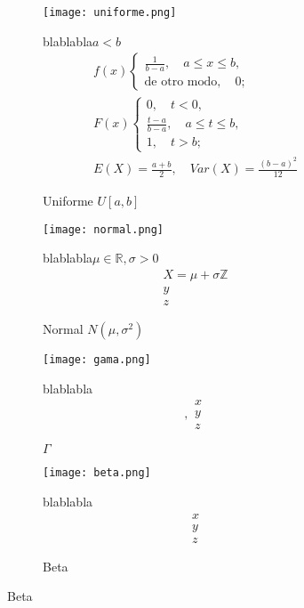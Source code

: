 \begin{figure}[H]
	\begin{subfigure}[t]{.5\textwidth}
		\texttt{[image: uniforme.png]}\caption{Uniforme $U[a,b]$}
		blablabla$a<b$
		\begin{equation}
		\begin{matrix}
		f(x)\begin{cases}\frac{1}{b-a},\quad a\leq x\leq b,\\\text{de otro modo},\quad 0;\end{cases}\\
		F(x)\begin{cases}0,\quad t<0,\\\frac{t-a}{b-a},\quad a\leq t\leq b,\\1,\quad t>b;\end{cases}\\
		E(X)=\frac{a+b}{2},\quad Var(X)=\frac{{(b-a)}^2}{12}
		\end{matrix}
		\end{equation}
	\end{subfigure}\qquad
\begin{subfigure}[t]{.5\textwidth}
	\texttt{[image: normal.png]}\caption{Normal $N(\mu,\sigma^2)$}
	blablabla$\mu\in\mathbb{R},\sigma>0$
	\begin{equation}
	\begin{matrix}
	X=\mu+\sigma\mathbb{Z}\\
	y\\
	z
	\end{matrix}
	\end{equation}
\end{subfigure}

	\begin{subfigure}[t]{.5\textwidth}
		\texttt{[image: gama.png]}\caption{$\Gamma$}
		blablabla
		\begin{equation},
		\begin{matrix}
		x\\
		y\\
		z
		\end{matrix}
		\end{equation}
	\end{subfigure}

\begin{subfigure}[t]{.5\textwidth}
		\texttt{[image: beta.png]}\caption{Beta}
		blablabla
		\begin{equation}
		\begin{matrix}
		x\\
		y\\
		z
		\end{matrix}
		\end{equation}
	\end{subfigure}


\end{figure}
